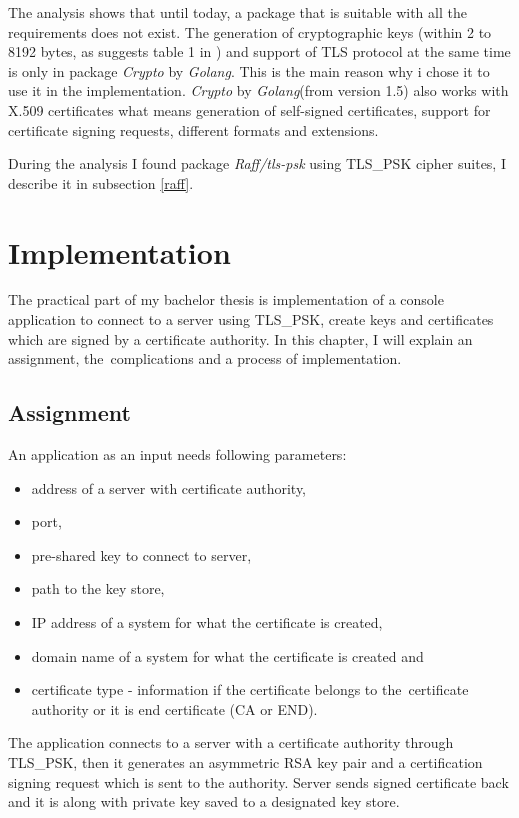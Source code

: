 \documentclass[
  12pt, 
  digital, %
  notable,   %
  nolof,     %
  nolot,     %
]{fithesis3}
\begin{document}
The analysis shows that until today, a package that is suitable with all the requirements does not 
exist. The generation of cryptographic keys (within 2 to 8192 bytes, as suggests 
table 1 in \cite{hinek2008security}) and support of TLS protocol at the same time is only in 
package \textit{Crypto} by \textit{Golang}. This is the main reason why i chose it to use it in 
the implementation. \textit{Crypto} by \textit{Golang}(from version 1.5) also works with X.509 
certificates what means generation of self-signed certificates, support for certificate signing 
requests, different formats and extensions. %

During the analysis I found package \textit{Raff/tls-psk} using TLS\_PSK cipher suites, I describe it 
in subsection \ref{raff}.

\chapter{Implementation}

The practical part of my bachelor thesis is implementation of a console application to connect to a 
server using TLS\_PSK, create keys and certificates which are signed by a certificate authority. In 
this chapter, I will explain an assignment, the~complications and a process of implementation. 

\section{Assignment}
An application as an input needs following parameters:
\begin{itemize}[leftmargin=2em,rightmargin=1em,itemsep=0.75\parskip,parsep=0em,topsep=0em,partopsep=0em]
\item address of a server with certificate authority,
\item port,
\item pre-shared key to connect to server,
\item path to the key store,
\item IP address of a system for what the certificate is created,
\item domain name of a system for what the certificate is created and 
\item certificate type - information if the certificate belongs to the~certificate authority or it is end certificate (CA or END).
\end{itemize}
\vskip 0.1in
The application connects to a server with a certificate authority through TLS\_PSK, then it 
generates an asymmetric RSA key pair and a certification signing request which is sent to the 
authority. Server sends signed certificate back and it is along with private key saved to a 
designated key store.
\end{document}

